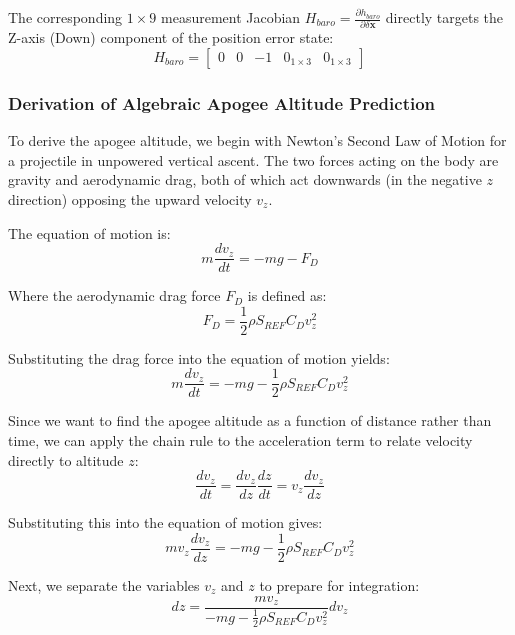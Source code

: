 \documentclass[11pt, a4paper]{article} %
\begin{document}
The corresponding $1 \times 9$ measurement Jacobian $H_{baro} = \frac{\partial h_{baro}}{\partial \delta\mathbf{x}}$ directly targets the Z-axis (Down) component of the position error state:
\[
H_{baro} = \begin{bmatrix} 0 & 0 & -1 & 0_{1\times3} & 0_{1\times3} \end{bmatrix}
\]

\subsubsection{Derivation of Algebraic Apogee Altitude Prediction}

To derive the apogee altitude, we begin with Newton's Second Law of Motion for a projectile in unpowered vertical ascent. The two forces acting on the body are gravity and aerodynamic drag, both of which act downwards (in the negative $z$ direction) opposing the upward velocity $v_z$. 

The equation of motion is:
\begin{equation}
    m \frac{dv_z}{dt} = -mg - F_D
\end{equation}

Where the aerodynamic drag force $F_D$ is defined as:
\begin{equation}
    F_D = \frac{1}{2} \rho S_{REF} C_D v_z^2
\end{equation}

Substituting the drag force into the equation of motion yields:
\begin{equation}
    m \frac{dv_z}{dt} = -mg - \frac{1}{2} \rho S_{REF} C_D v_z^2
\end{equation}

Since we want to find the apogee altitude as a function of distance rather than time, we can apply the chain rule to the acceleration term to relate velocity directly to altitude $z$:
\begin{equation}
    \frac{dv_z}{dt} = \frac{dv_z}{dz} \frac{dz}{dt} = v_z \frac{dv_z}{dz}
\end{equation}

Substituting this into the equation of motion gives:
\begin{equation}
    m v_z \frac{dv_z}{dz} = -mg - \frac{1}{2} \rho S_{REF} C_D v_z^2
\end{equation}

Next, we separate the variables $v_z$ and $z$ to prepare for integration:
\begin{equation}
    dz = \frac{m v_z}{-mg - \frac{1}{2} \rho S_{REF} C_D v_z^2} dv_z
\end{equation}
\end{document}
